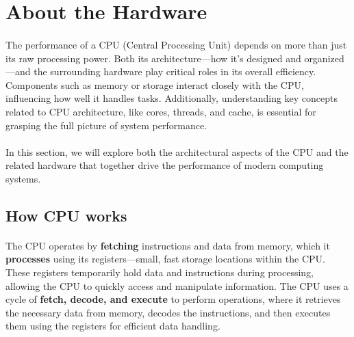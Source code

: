 \section{About the Hardware}

    \paragraph*{}
    The performance of a CPU (Central Processing Unit) depends on more than just its raw processing power. 
    Both its architecture—how it’s designed and organized—and the surrounding hardware play critical roles in 
    its overall efficiency. Components such as memory or storage interact closely with the CPU, influencing how well 
    it handles tasks. Additionally, understanding key concepts related to CPU architecture, like cores, threads, and cache, 
    is essential for grasping the full picture of system performance. 
    \par

    \paragraph*{}
    In this section, we will explore both the architectural aspects of the CPU and the related hardware that together 
    drive the performance of modern computing systems.
    \par



\subsection{How CPU works}

    \paragraph*{}
    The CPU operates by \textbf{fetching} instructions and data from memory, which it \textbf{processes} using its registers—small, 
    fast storage locations within the CPU. These registers temporarily hold data and instructions during processing, 
    allowing the CPU to quickly access and manipulate information. The CPU uses a cycle of \textbf{fetch, decode, and execute} 
    to perform operations, where it retrieves the necessary data from memory, decodes the instructions, and then executes 
    them using the registers for efficient data handling.
    \par

